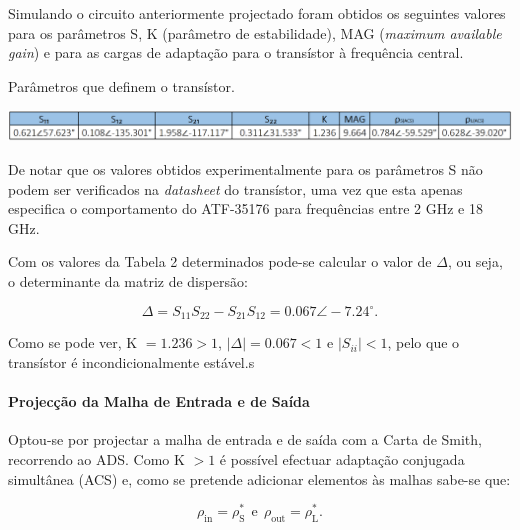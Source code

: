 \documentclass[11pt]{article}
\numberwithin{equation}{section}
\begin{document}
Simulando o circuito anteriormente projectado foram obtidos os seguintes valores para os parâmetros S, K (parâmetro de estabilidade), MAG (\textit{maximum available gain}) e para as cargas de adaptação para o transístor à frequência central.

\begin{table}[H]
 	\centering
 	\caption{Parâmetros que definem o transístor.}
 	\vspace{-1.5mm}
 	\includegraphics[keepaspectratio=true, scale=0.45]{teoricas/table2}
 	\label{tab:param_S}
\end{table}

De notar que os valores obtidos experimentalmente para os parâmetros S não podem ser verificados na \textit{datasheet} do transístor, uma vez que esta apenas especifica o comportamento do ATF-35176 para frequências entre 2 GHz e 18 GHz.

Com os valores da Tabela 2 determinados pode-se calcular o valor de $\Delta$, ou seja, o determinante da matriz de dispersão:

\vspace{-3mm}
\begin{equation}
\Delta = S_{11}S_{22} - S_{21}S_{12} = 0.067\angle-7.24 ^{\circ}.
\label{eq:delta}
\end{equation}

\vspace{1mm} 
Como se pode ver, K $= 1.236 > 1$, $\lvert \Delta \rvert = 0.067 < 1$ e $\lvert S_{ii} \rvert < 1$, pelo que o transístor é incondicionalmente estável.s

\paragraph{Projecção da Malha de Entrada e de Saída} \hspace{0pt} 

Optou-se por projectar a malha de entrada e de saída com a Carta de Smith, recorrendo ao ADS. Como K $ > 1$ é possível efectuar adaptação conjugada simultânea (ACS) e, como se pretende adicionar elementos às malhas sabe-se que:

\vspace{-3mm}
\begin{equation}
\rho_{\text{in}} = \rho_{\text{S}}^{*} ~~ \text{e} ~~ \rho_{\text{out}} = \rho_{\text{L}}^{*}.
\end{equation}
\end{document}
